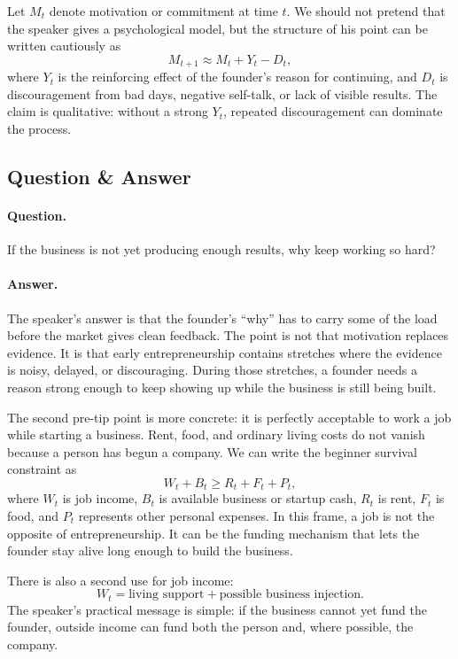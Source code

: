 Let \(M_t\) denote motivation or commitment at time \(t\). We should not pretend that the speaker gives a psychological model, but the structure of his point can be written cautiously as
\[
M_{t+1}
\approx
M_t
+
Y_t
-
D_t,
\]
where \(Y_t\) is the reinforcing effect of the founder's reason for continuing, and \(D_t\) is discouragement from bad days, negative self-talk, or lack of visible results. The claim is qualitative: without a strong \(Y_t\), repeated discouragement can dominate the process.

\subsection{Question \& Answer}

\paragraph{Question.}
If the business is not yet producing enough results, why keep working so hard?

\paragraph{Answer.}
The speaker's answer is that the founder's ``why'' has to carry some of the load before the market gives clean feedback. The point is not that motivation replaces evidence. It is that early entrepreneurship contains stretches where the evidence is noisy, delayed, or discouraging. During those stretches, a founder needs a reason strong enough to keep showing up while the business is still being built.

The second pre-tip point is more concrete: it is perfectly acceptable to work a job while starting a business. Rent, food, and ordinary living costs do not vanish because a person has begun a company. We can write the beginner survival constraint as
\[
W_t + B_t \geq R_t + F_t + P_t,
\]
where \(W_t\) is job income, \(B_t\) is available business or startup cash, \(R_t\) is rent, \(F_t\) is food, and \(P_t\) represents other personal expenses. In this frame, a job is not the opposite of entrepreneurship. It can be the funding mechanism that lets the founder stay alive long enough to build the business.

There is also a second use for job income:
\[
W_t
=
\text{living support}
+
\text{possible business injection}.
\]
The speaker's practical message is simple: if the business cannot yet fund the founder, outside income can fund both the person and, where possible, the company.

